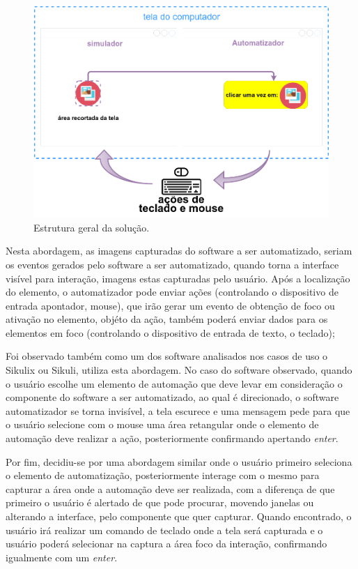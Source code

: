\documentclass[tg]{mdtufsm}
\begin{document}
                \begin{figure}[!htb]
                    {\centering
                    \includegraphics[width=1.0\textwidth]{imagens/actionRecord}
                    \caption{Estrutura geral da solução.}
                    \label{fig:actionRecord}}
                \end{figure}

                Nesta abordagem, as imagens capturadas do software a ser automatizado, seriam os eventos gerados pelo software a ser automatizado, quando torna a interface visível para interação, imagens estas capturadas pelo usuário. Após a localização do elemento, o automatizador pode enviar ações (controlando o dispositivo de entrada apontador, mouse), que irão gerar um evento de obtenção de foco ou ativação no elemento, objéto da ação, também poderá enviar dados para os elementos em foco (controlando o dispositivo de entrada de texto, o teclado);

                Foi observado também como um dos software analisados nos casos de uso o Sikulix ou Sikuli, utiliza esta abordagem. No caso do software observado, quando o usuário escolhe um elemento de automação que deve levar em consideração o componente do software a ser automatizado, ao qual é direcionado, o software automatizador se torna invisível, a tela escurece e uma mensagem pede para que o usuário selecione com o mouse uma área retangular onde o elemento de automação deve realizar a ação, posteriormente confirmando apertando \emph{enter}.

                Por fim, decidiu-se por uma abordagem similar onde o usuário primeiro seleciona o elemento de automatização, posteriormente interage com o mesmo para capturar a área onde a automação deve ser realizada, com a diferença de que primeiro o usuário é alertado de que pode procurar, movendo janelas ou alterando a interface, pelo componente que quer capturar. Quando encontrado, o usuário irá realizar um comando de teclado onde a tela será capturada e o usuário poderá selecionar na captura a área foco da interação, confirmando igualmente com um \emph{enter}.
\end{document}
